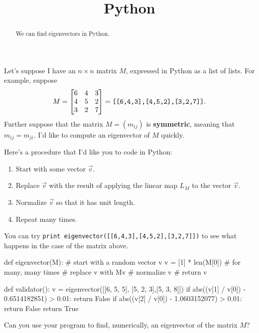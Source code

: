 \documentclass{ximera}
\title{Python}
\begin{document}
\begin{abstract}
  We can find eigenvectors in Python.
\end{abstract}

Let's suppose I have an $n \times n$ matrix $M$, expressed in Python as a list of lists.  For example, suppose
$$
M = \begin{bmatrix}
6 & 4 & 3 \\
4 & 5 & 2 \\
3 & 2 & 7 \\
\end{bmatrix} = \text{\texttt{[[6,4,3],[4,5,2],[3,2,7]]}}.
$$
Further suppose that the matrix $M = (m_{ij})$ is \textbf{symmetric},
meaning that $m_{ij} = m_{ji}$.  I'd like to compute an eigenvector of
$M$ quickly.

\begin{question}
  Here's a procedure that I'd like you to code in Python:
  \begin{enumerate}
  \item Start with some vector $\vec{v}$.
  \item Replace $\vec{v}$ with the result of applying the linear map $L_M$ to the vector $\vec{v}$.
  \item Normalize $\vec{v}$ so that it has unit length.
  \item Repeat many times.
  \end{enumerate}

  You can try \texttt{print eigenvector([[6,4,3],[4,5,2],[3,2,7]])} to
  see what happens in the case of the matrix above.

  \begin{solution}
    \begin{python}
def eigenvector(M):
  # start with a random vector v
  v = [1] * len(M[0])
  # for many, many times
  #   replace v with Mv
  #   normalize v
  # return v 

def validator():
  v = eigenvector([[6, 5, 5], [5, 2, 3],[5, 3, 8]])
  if abs((v[1] / v[0]) - 0.6514182851) > 0.01:
    return False
  if abs((v[2] / v[0]) - 1.0603152077) > 0.01:
    return False
  return True
    \end{python}
  \end{solution}

Can you use your program to find, numerically, an eigenvector of the matrix $M$?

\end{question}
\end{document}
